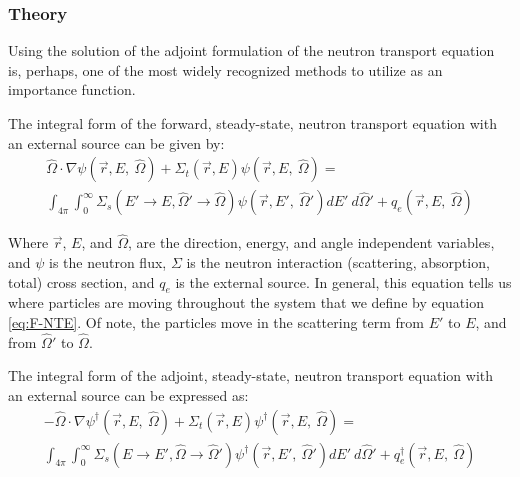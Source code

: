 \subsubsection{Theory}

Using the solution of the adjoint formulation of the neutron transport
equation is, perhaps, one of the most widely recognized methods to utilize as an
importance function.

The integral form of the forward, steady-state, neutron transport equation with
an external source can be given by:
\begin{multline}
\hat\Omega \cdot \nabla \psi
        (\vec {r} ,E,\:\hat\Omega)+\Sigma _{ t }
        (\vec{r},E)\psi (\vec { r } ,E,\:\hat\Omega) = \\
        \int _{ 4\pi  } \int _{ 0 }^{ \infty  } \Sigma _{ s }(E'\rightarrow E,
        \hat\Omega'\rightarrow\hat\Omega)\psi (\vec { r } ,E',\: \hat\Omega')dE'
        \:d\hat\Omega' + q_{e}(\vec { r } ,E, \:\hat\Omega)
\label{eq:F-NTE}
\end{multline}

Where $\vec { r }$, $E$, and $\hat\Omega$, are the direction, energy, and angle
independent variables, and $\psi$ is the neutron flux, $\Sigma$ is the neutron
interaction (scattering, absorption, total) cross section, and $q_{e}$ is the
external source. In general, this equation tells us where particles are moving
throughout the system that we define by equation \ref{eq:F-NTE}. Of note, the
particles move in the scattering term from $E'$ to $E$, and from $\hat\Omega'$
to $\hat\Omega$.

The integral form of the adjoint, steady-state, neutron transport equation with
an external source can be expressed as:
\begin{multline}
-\hat\Omega \cdot \nabla \psi^{\dagger}
        (\vec {r} ,E,\:\hat\Omega)+\Sigma _{ t }
        (\vec{r},E)\psi^{\dagger}  (\vec { r } ,E,\:\hat\Omega)
       = \\
        \int _{ 4\pi  } \int _{ 0 }^{ \infty  } \Sigma _{ s }(E\rightarrow E',
        \hat\Omega\rightarrow\hat\Omega')\psi^{\dagger}  (\vec { r } ,E',\:
        \hat\Omega')dE' \:d\hat\Omega' + q_{e}^\dagger(\vec { r } ,E, \:\hat\Omega)
\label{eq:A-NTE}
\end{multline}


